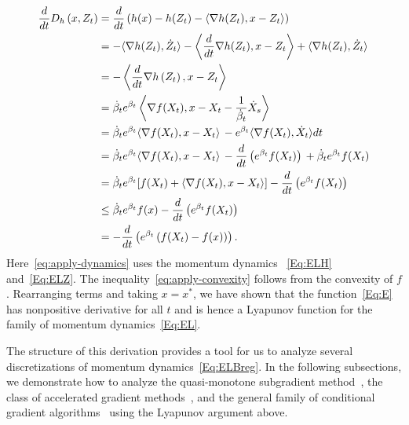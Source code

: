 \documentclass[11pt]{article}
\theoremstyle{plain}
\begin{document}
\begin{subequations}\label{Eq:LyapAnal}
\begin{align}
 \frac{d}{dt}D_h\left(x, Z_t\right)  &= \frac{d}{dt}\left( h(x) - h(Z_t) - \langle \nabla h(Z_t), x- Z_t\rangle\right)  \notag\\
& = - \langle \nabla h(Z_t), \dot Z_t\rangle -\left\langle \frac{d}{dt} \nabla h(Z_t),x - Z_t\right\rangle  + \langle \nabla h(Z_t), \dot Z_t\rangle \notag\\ 
 &= -\left\langle \frac{d}{dt} \nabla h\left(Z_t\right), x - Z_t\right\rangle \, \notag\\%
&=   \dot \beta_t e^{\beta_t}\left\langle\nabla f(X_t), x  - X_{t} - \frac{1}{\dot \beta_t} \dot X_{s} \right\rangle  \, \label{eq:apply-dynamics}   \\
& =   \dot \beta_t e^{\beta_t} \langle \nabla f(X_t), x - X_t \rangle\, - e^{ \beta_t} \langle \nabla f(X_t), \dot X_t\rangle dt\, \notag   \\
& = \dot \beta_t e^{\beta_t} \langle \nabla f(X_t), x - X_t \rangle\,  -   \frac{d}{dt}\left(e^{ \beta_t} f(X_t)\right)\,   + \dot \beta_t e^{\beta_t}  f(X_t)  \notag\\
&= \dot \beta_t e^{\beta_t} [f(X_t)+ \langle \nabla f(X_t), x - X_t \rangle] -\frac{d}{dt}\left(e^{ \beta_t} f(X_t)\right)\,  \notag  \\ %
& \leq  \dot \beta_t e^{\beta_t}f(x) - \frac{d}{dt}\left(e^{ \beta_t} f(X_t)\right)\, \label{eq:apply-convexity}\\
& = - \frac{d}{dt} \left(e^{\beta_t}\left(f(X_t) - f(x)\right)\right) \label{Eq:cond1}.
\end{align}
\end{subequations}
Here~\eqref{eq:apply-dynamics} uses the momentum dynamics%
~\eqref{Eq:ELH} and~\eqref{Eq:ELZ}. 
The inequality~\eqref{eq:apply-convexity} follows from the convexity of $f$. Rearranging terms and taking $x = x^\ast$, we have shown that the function~\eqref{Eq:E} has nonpositive derivative for all $t$ and is hence a Lyapunov function for the family of momentum dynamics~\eqref{Eq:EL}.

 The structure of this derivation provides a tool for us to analyze several discretizations of momentum dynamics~\eqref{Eq:ELBreg}.
 In the following subsections, we demonstrate how to analyze the quasi-monotone subgradient method~\cite{Nesterov15}, the class of accelerated gradient methods~\cite{Baes09,Acceleration}, and the general family of conditional gradient algorithms~\cite{NesterovCond15} using the Lyapunov argument above.
\end{document}
